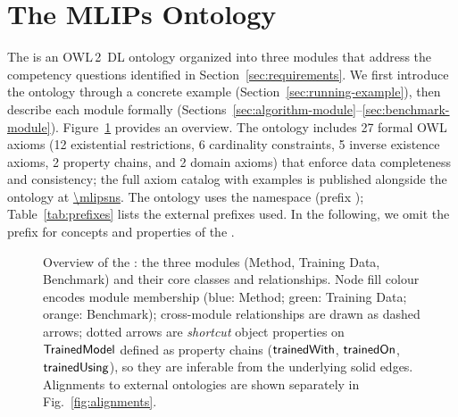\section{The MLIPs Ontology}
\label{sec:ontology}

The \MLIPsOntology{} is an OWL\,2~DL ontology organized into three modules
that address the competency questions identified in
Section~\ref{sec:requirements}. We first introduce the ontology through a
concrete example (Section~\ref{sec:running-example}), then describe each
module formally (Sections~\ref{sec:algorithm-module}--\ref{sec:benchmark-module}).
Figure~\ref{fig:ontology-overview} provides an overview. The ontology
includes 27 formal OWL axioms (12 existential restrictions, 6 cardinality
constraints, 5 inverse existence axioms, 2 property chains, and 2 domain
axioms) that enforce data completeness and consistency; the full axiom
catalog with examples is published alongside the ontology at
\url{\mlipsns}. The ontology uses the namespace \texttt{\mlipsns} (prefix
\mlipsprefix{}); Table~\ref{tab:prefixes} lists the external prefixes used.
In the following, we omit the \mlipsprefix{} prefix for concepts and
properties of the \MLIPsOntology{}.



\begin{figure}[t]
\centering
\resizebox{\textwidth}{!}{}
\caption{Overview of the \MLIPsOntology{}: the three modules (Method,
  Training Data, Benchmark) and their core classes and relationships.
  Node fill colour encodes module membership (blue: Method; green:
  Training Data; orange: Benchmark); cross-module relationships are
  drawn as dashed arrows; dotted arrows are \emph{shortcut} object
  properties on $\mathsf{TrainedModel}$ defined as property chains
  ($\mathsf{trainedWith}$, $\mathsf{trainedOn}$, $\mathsf{trainedUsing}$), so they are
  inferable from the underlying solid edges.  Alignments to external
  ontologies are shown separately in Fig.~\ref{fig:alignments}.}
\label{fig:ontology-overview}
\end{figure}

